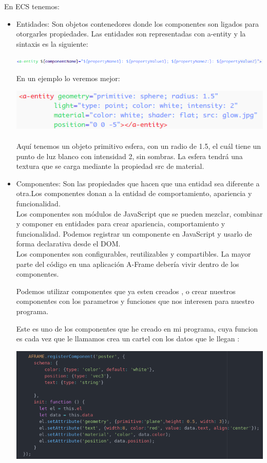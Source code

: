 \documentclass[a4paper, 12pt]{book}
\begin{document}
En ECS tenemos:
\begin{itemize}
    \item Entidades: Son objetos contenedores donde los componentes son ligados para otorgarles propiedades.
    Las entidades son representadas con a-entity y la sintaxis es la siguiente:

\includegraphics[scale=0.53]{img/entidad1.png}

En un ejemplo lo veremos mejor:

\includegraphics[scale=0.7]{img/entidad.png}\\
\\
Aquí tenemos un objeto primitivo esfera, con un radio de 1.5, el cuál tiene un punto de luz blanco con intensidad 2, sin sombras. La esfera tendrá una textura que se carga mediante la propiedad src de material.
    
    \item  Componentes: Son las propiedades que hacen que una entidad sea diferente a otra.Los componentes donan a la entidad de comportamiento, apariencia y funcionalidad.
    \\Los componentes son módulos de JavaScript que se pueden mezclar, combinar y componer en entidades para crear apariencia, comportamiento y funcionalidad. Podemos registrar un componente en JavaScript y usarlo de forma declarativa desde el DOM.\\ Los componentes son configurables, reutilizables y compartibles. La mayor parte del código en una aplicación A-Frame debería vivir dentro de los componentes.
    
    Podemos utilizar componentes que ya esten creados , o crear nuestros componentes con los parametros y funciones que nos interesen para nuestro programa.
    
    Este es uno de los componentes que he creado en mi programa, cuya funcion es cada vez que le llamamos crea un cartel con los datos que le llegan :
    
    \includegraphics[scale=0.6]{img/componente.png}\\
    

\end{itemize}
\end{document}
